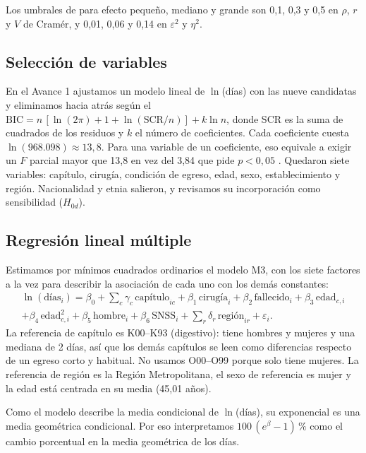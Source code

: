 \documentclass[10.5pt,a4paper,headings=small,abstract=false,bibliography=totoc,listof=totoc]{scrartcl}
\newcommand{\pct}{\,\%}
\begin{document}
Los umbrales de \citet{cohen1988} para efecto pequeño, mediano y grande son 0,1, 0,3 y 0,5 en $\rho$, $r$ y $V$ de Cramér, y 0,01, 0,06 y 0,14 en $\varepsilon^2$ y $\eta^2$.

\subsection{Selección de variables}

En el Avance 1 ajustamos un modelo lineal de $\ln$(días) con las nueve candidatas y eliminamos hacia atrás según el $\mathrm{BIC}=n\,[\ln(2\pi)+1+\ln(\mathrm{SCR}/n)]+k\ln n$, donde SCR es la suma de cuadrados de los residuos y $k$ el número de coeficientes. Cada coeficiente cuesta $\ln(968.098)\approx 13{,}8$. Para una variable de un coeficiente, eso equivale a exigir un $F$ parcial mayor que 13,8 en vez del 3,84 que pide $p<0{,}05$ \citep{raftery1995}. Quedaron siete variables: capítulo, cirugía, condición de egreso, edad, sexo, establecimiento y región. Nacionalidad y etnia salieron, y revisamos su incorporación como sensibilidad ($H_{0d}$).

\subsection{Regresión lineal múltiple}\label{sec:lineal}

Estimamos por mínimos cuadrados ordinarios el modelo M3, con los siete factores a la vez para describir la asociación de cada uno con los demás constantes:
\begin{multline*}
\ln(\text{días}_i)=\beta_0+\sum_c\gamma_c\,\text{capítulo}_{ic}+\beta_1\,\text{cirugía}_i+\beta_2\,\text{fallecido}_i+\beta_3\,\text{edad}_{c,i}\\
+\beta_4\,\text{edad}_{c,i}^2+\beta_5\,\text{hombre}_i+\beta_6\,\text{SNSS}_i+\sum_r\delta_r\,\text{región}_{ir}+\varepsilon_i .
\end{multline*}
La referencia de capítulo es K00--K93 (digestivo): tiene hombres y mujeres y una mediana de 2 días, así que los demás capítulos se leen como diferencias respecto de un egreso corto y habitual. No usamos O00--O99 porque solo tiene mujeres. La referencia de región es la Región Metropolitana, el sexo de referencia es mujer y la edad está centrada en su media (45,01 años).

Como el modelo describe la media condicional de $\ln$(días), su exponencial es una media geométrica condicional. Por eso interpretamos $100\,(e^{\beta}-1)\pct{}$ como el cambio porcentual en la media geométrica de los días.
\end{document}
